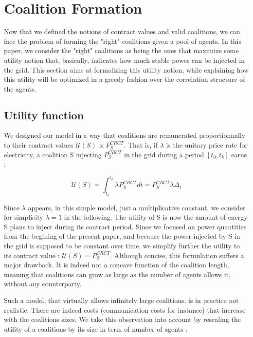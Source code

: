 \documentclass[conference]{IEEEtran}
\begin{document}
\section{Coalition Formation}
\label{sec:forming}

Now that we defined the notions of contract values and valid coalitions, we can face the problem of forming the "right" coalitions given a pool of agents. In this paper, we consider the "right" coalitions as being the ones that maximize some utility notion that, basically, indicates how much stable power can be injected in the grid. This section aims at formalizing this utility notion, while explaining how this utility will be optimized in a greedy fashion over the correlation structure of the agents. 


\subsection{Utility function}

We designed our model in a way that coalitions are remunerated proportionnally to their contract values $ \mathcal{U}(S) \propto P_{S}^{CRCT} $. That is, if $ \lambda $ is the unitary price rate for electricity, a coalition S injecting $ P_{S}^{CRCT} $ in the grid during a period $ [t_{0},t_{k}] $ earns :

\begin{equation}
\mathcal{U}(S ) = \int_{t_{0}}^{t_{k}} \lambda P_{S}^{CRCT} dt = P_{S}^{CRCT} \lambda \Delta_{t}
\end{equation} 

Since $ \lambda $ appears, in this simple model, just a multiplicative constant, we consider for simplicity $ \lambda = 1 $ in the following. The utility of S is now the amount of energy S plans to inject during its contract period. Since we focused on power quantities from the begining of the present paper, and because the power injected by S in the grid is supposed to be constant over time, we simplify further the utility to its contract value : $ \mathcal{U}(S) = P_{S}^{CRCT} $. Although concise, this formulation suffers a major drawback. It is indeed not a concave function of the coalition length, meaning that coalitions can grow as large as the number of agents allows it, without any counterparty. 

Such a model, that virtually allows infinitely large coalitions, is in practice not realistic. There are indeed costs (communication costs for instance) that increase with the coalitions sizes. We take this observation into account by rescaling the utility of a coalitions by its size in term of number of agents :
\end{document}
